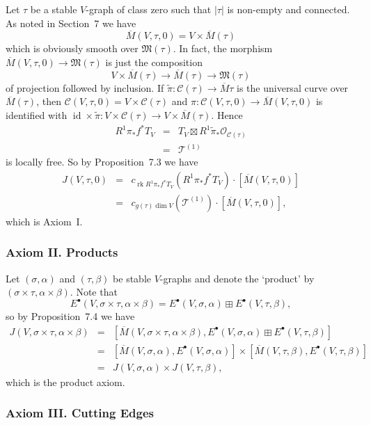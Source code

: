 \documentclass[11pt]{article}
\newcommand{\MM}{\mathfrak{M}}
\renewcommand{\O}{\mathcal{O}}
\newcommand{\cC}{\mathcal{C}}
\newcommand{\com}{^{\scriptscriptstyle\bullet}}
\DeclareMathOperator{\id}{id}
\newcommand{\lst}{_{\ast}}
\newcommand{\ol}{\overline}
\DeclareMathOperator{\rk}{rk}
\newcommand{\tT}{\mathcal{T}}
\renewcommand{\tilde}{\widetilde}
\newcommand{\upst}{^{\ast}}
\theoremstyle{plain}
\theoremstyle{remark}
\theoremstyle{plain}
\theoremstyle{definition}
\theoremstyle{remark}
\begin{document}
Let \(\tau\) be a stable \(V\)-graph of class zero such that \(|\tau|\) is
non-empty and connected. As noted in \cite{BM} Section~7 we have
\[
\ol{M}(V,\tau,0)=V\times\ol{M}(\tau)
\]
which is obviously smooth over \(\MM(\tau)\). In fact, the morphism
\(\ol{M}(V,\tau,0)\to\MM(\tau)\) is just the composition
\[
V\times\ol{M}(\tau)\longrightarrow\ol{M}(\tau)\longrightarrow\MM(\tau)
\]
of projection followed by inclusion. If
\(\tilde{\pi}:\cC(\tau)\to\ol{M}{\tau}\) is the universal curve over
\(\ol{M}(\tau)\), then \(\cC(V,\tau,0)=V\times\cC(\tau)\) and
\(\pi:\cC(V,\tau,0)\to\ol{M}(V,\tau,0)\) is identified with
\(\id\times\tilde{\pi}:V\times\cC(\tau)\to V\times\ol{M}(\tau)\). Hence
\begin{eqnarray*}
R^1\pi\lst f\upst T_V&=&T_V\boxtimes
R^1\tilde{\pi}\lst\O_{\cC(\tau)}\\&=&\tT^{(1)}
\end{eqnarray*}
is locally free. So by \cite{BF} Proposition~7.3 we have
\begin{eqnarray*}
J(V,\tau,0) & = & c_{\rk R^1\pi\lst f\upst T_V}(R^1\pi\lst f\upst
T_V)\cdot[\ol{M}(V,\tau,0)]\\
& = & c_{g(\tau)\dim V}(\tT^{(1)})\cdot[\ol{M}(V,\tau,0)],
\end{eqnarray*}
which is Axiom~I.

\subsubsection{{\sc Axiom II.} Products}

Let \((\sigma,\alpha)\) and \((\tau,\beta)\) be stable \(V\)-graphs and
denote the `product' by \((\sigma\times\tau,\alpha\times\beta)\).
Note that
\[
E\com(V,\sigma\times\tau,\alpha\times\beta) =
E\com(V,\sigma,\alpha)\boxplus E\com(V,\tau,\beta),
\]
so by \cite{BF} Proposition~7.4 we have
\begin{eqnarray*}
J(V,\sigma\times\tau,\alpha\times\beta) & = &
[\ol{M}(V,\sigma\times\tau,\alpha\times\beta),
E\com(V,\sigma,\alpha)\boxplus E\com(V,\tau,\beta)]  \\
& = & [\ol{M}(V,\sigma,\alpha),E\com(V,\sigma,\alpha)] \times
[\ol{M}(V,\tau,\beta),E\com(V,\tau,\beta)] \\
& = & J(V,\sigma,\alpha)\times J(V,\tau,\beta),
\end{eqnarray*}
which is the product axiom.

\subsubsection{{\sc Axiom III.} Cutting Edges}
\end{document}
